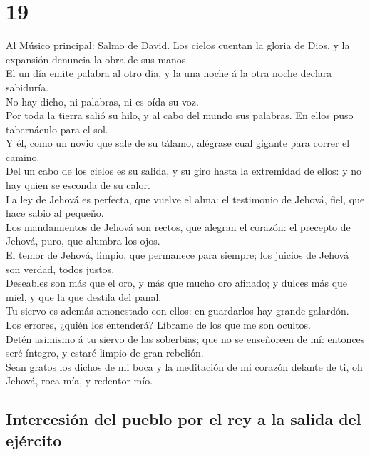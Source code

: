 \hypertarget{section-19-19}{%
\section{19}\label{section-19-19}}

 Al Músico principal: Salmo de David. Los cielos cuentan
la gloria de Dios, y la expansión denuncia la obra de sus manos.\\
 El un día emite palabra al otro día, y la una noche á la
otra noche declara sabiduría.\\
 No hay dicho, ni palabras, ni es oída su voz.\\
 Por toda la tierra salió su hilo, y al cabo del mundo sus
palabras. En ellos puso tabernáculo para el sol.\\
 Y él, como un novio que sale de su tálamo, alégrase cual
gigante para correr el camino.\\
 Del un cabo de los cielos es su salida, y su giro hasta
la extremidad de ellos: y no hay quien se esconda de su calor.\\
 La ley de Jehová es perfecta, que vuelve el alma: el
testimonio de Jehová, fiel, que hace sabio al pequeño.\\
 Los mandamientos de Jehová son rectos, que alegran el
corazón: el precepto de Jehová, puro, que alumbra los ojos.\\
 El temor de Jehová, limpio, que permanece para siempre;
los juicios de Jehová son verdad, todos justos.\\
 Deseables son más que el oro, y más que mucho oro
afinado; y dulces más que miel, y que la que destila del panal.\\
 Tu siervo es además amonestado con ellos: en guardarlos
hay grande galardón.\\
 Los errores, ¿quién los entenderá? Líbrame de los que me
son ocultos.\\
 Detén asimismo á tu siervo de las soberbias; que no se
enseñoreen de mí: entonces seré íntegro, y estaré limpio de gran
rebelión.\\
 Sean gratos los dichos de mi boca y la meditación de mi
corazón delante de ti, oh Jehová, roca mía, y redentor mío.

\hypertarget{intercesiuxf3n-del-pueblo-por-el-rey-a-la-salida-del-ejuxe9rcito}{%
\subsection{Intercesión del pueblo por el rey a la salida del
ejército}\label{intercesiuxf3n-del-pueblo-por-el-rey-a-la-salida-del-ejuxe9rcito}}

